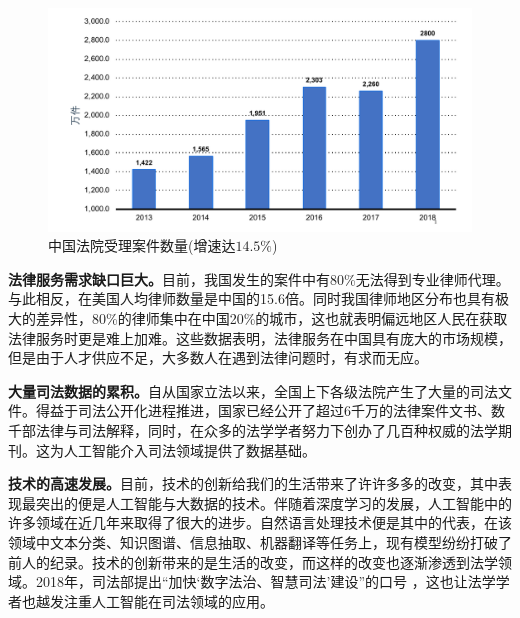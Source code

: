\begin{figure}[ht]
    \centering
    \includegraphics[width=\linewidth]{figures/case_num}
    \caption{中国法院受理案件数量(增速达\textbf{$14.5\%$})}
    \label{fig:case_num}
\end{figure}

\textbf{法律服务需求缺口巨大。}目前，我国发生的案件中有80\%无法得到专业律师代理。与此相反，在美国人均律师数量是中国的15.6倍。同时我国律师地区分布也具有极大的差异性，80\%的律师集中在中国20\%的城市，这也就表明偏远地区人民在获取法律服务时更是难上加难。这些数据表明，法律服务在中国具有庞大的市场规模，但是由于人才供应不足，大多数人在遇到法律问题时，有求而无应。

\textbf{大量司法数据的累积。}自从国家立法以来，全国上下各级法院产生了大量的司法文件。得益于司法公开化进程推进，国家已经公开了超过6千万的法律案件文书、数千部法律与司法解释，同时，在众多的法学学者努力下创办了几百种权威的法学期刊。这为人工智能介入司法领域提供了数据基础。

\textbf{技术的高速发展。}目前，技术的创新给我们的生活带来了许许多多的改变，其中表现最突出的便是人工智能与大数据的技术。伴随着深度学习的发展，人工智能中的许多领域在近几年来取得了很大的进步。自然语言处理技术便是其中的代表，在该领域中文本分类、知识图谱、信息抽取、机器翻译等任务上，现有模型纷纷打破了前人的纪录。技术的创新带来的是生活的改变，而这样的改变也逐渐渗透到法学领域。2018年，司法部提出“加快‘数字法治、智慧司法’建设”的口号 ，这也让法学学者也越发注重人工智能在司法领域的应用。


